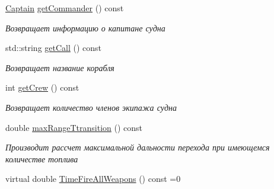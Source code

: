 \begin{DoxyCompactItemize}
\mbox{\label{class_aircraft_carrier_group_1_1_ship_a470db75c80e7b86ea985c147c4269c5f}} 
\mbox{\hyperlink{struct_aircraft_carrier_group_1_1_captain}{Captain}} \mbox{\hyperlink{class_aircraft_carrier_group_1_1_ship_a470db75c80e7b86ea985c147c4269c5f}{get\+Commander}} () const
\begin{DoxyCompactList}\small\item\em Возвращает информацию о капитане судна \end{DoxyCompactList}\item 
\mbox{\label{class_aircraft_carrier_group_1_1_ship_a2d60f306a850aca0e3bcff1bf525d317}} 
std\+::string \mbox{\hyperlink{class_aircraft_carrier_group_1_1_ship_a2d60f306a850aca0e3bcff1bf525d317}{get\+Call}} () const
\begin{DoxyCompactList}\small\item\em Возвращает название корабля \end{DoxyCompactList}\item 
\mbox{\label{class_aircraft_carrier_group_1_1_ship_a391730d8d2813022c066cef59c2f49f0}} 
int \mbox{\hyperlink{class_aircraft_carrier_group_1_1_ship_a391730d8d2813022c066cef59c2f49f0}{get\+Crew}} () const
\begin{DoxyCompactList}\small\item\em Возвращает количество членов экипажа судна \end{DoxyCompactList}\item 
\mbox{\label{class_aircraft_carrier_group_1_1_ship_af888c065dc11dd2186d5225802fcd85f}} 
double \mbox{\hyperlink{class_aircraft_carrier_group_1_1_ship_af888c065dc11dd2186d5225802fcd85f}{max\+Range\+Ttransition}} () const
\begin{DoxyCompactList}\small\item\em Производит рассчет максимальной дальности перехода при имеющемся количестве топлива \end{DoxyCompactList}\item 
\mbox{\label{class_aircraft_carrier_group_1_1_ship_a255221ad52eec6bd027854b1fdb18187}} 
virtual double \mbox{\hyperlink{class_aircraft_carrier_group_1_1_ship_a255221ad52eec6bd027854b1fdb18187}{Time\+Fire\+All\+Weapons}} () const =0

\end{DoxyCompactItemize}
